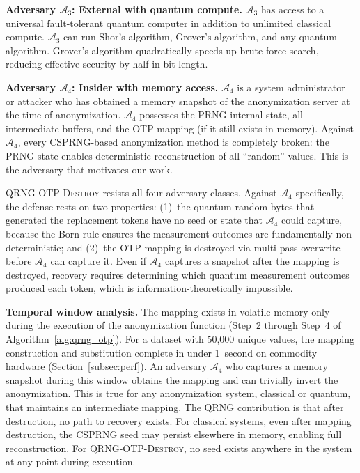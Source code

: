 \documentclass[journal]{IEEEtran}
\begin{document}
\textbf{Adversary $\mathcal{A}_3$: External with quantum compute.} $\mathcal{A}_3$ has access to a universal fault-tolerant quantum computer in addition to unlimited classical compute. $\mathcal{A}_3$ can run Shor's algorithm, Grover's algorithm, and any quantum algorithm. Grover's algorithm quadratically speeds up brute-force search, reducing effective security by half in bit length.

\textbf{Adversary $\mathcal{A}_4$: Insider with memory access.} $\mathcal{A}_4$ is a system administrator or attacker who has obtained a memory snapshot of the anonymization server at the time of anonymization. $\mathcal{A}_4$ possesses the PRNG internal state, all intermediate buffers, and the OTP mapping (if it still exists in memory). Against $\mathcal{A}_4$, every CSPRNG-based anonymization method is completely broken: the PRNG state enables deterministic reconstruction of all ``random'' values. This is the adversary that motivates our work.

\textsc{QRNG-OTP-Destroy} resists all four adversary classes. Against $\mathcal{A}_4$ specifically, the defense rests on two properties: (1)~the quantum random bytes that generated the replacement tokens have no seed or state that $\mathcal{A}_4$ could capture, because the Born rule ensures the measurement outcomes are fundamentally non-deterministic; and (2)~the OTP mapping is destroyed via multi-pass overwrite before $\mathcal{A}_4$ can capture it. Even if $\mathcal{A}_4$ captures a snapshot after the mapping is destroyed, recovery requires determining which quantum measurement outcomes produced each token, which is information-theoretically impossible.

\textbf{Temporal window analysis.} The mapping exists in volatile memory only during the execution of the anonymization function (Step~2 through Step~4 of Algorithm~\ref{alg:qrng_otp}). For a dataset with 50,000 unique values, the mapping construction and substitution complete in under 1~second on commodity hardware (Section~\ref{subsec:perf}). An adversary $\mathcal{A}_4$ who captures a memory snapshot during this window obtains the mapping and can trivially invert the anonymization. This is true for any anonymization system, classical or quantum, that maintains an intermediate mapping. The QRNG contribution is that after destruction, no path to recovery exists. For classical systems, even after mapping destruction, the CSPRNG seed may persist elsewhere in memory, enabling full reconstruction. For \textsc{QRNG-OTP-Destroy}, no seed exists anywhere in the system at any point during execution.
\end{document}
